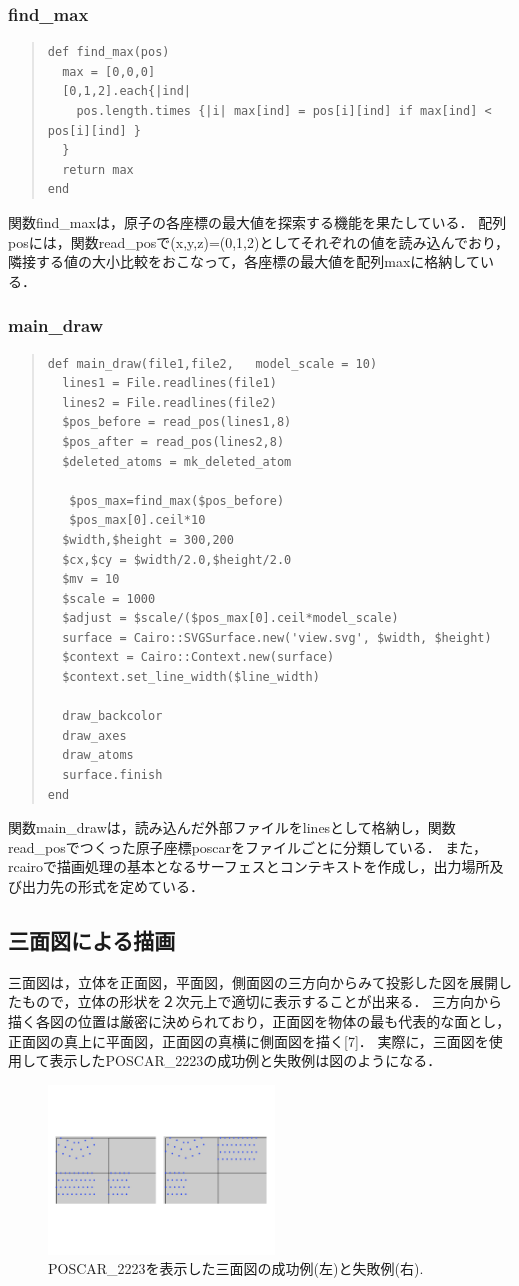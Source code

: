 \subsubsection{find\_max}\begin{quote}\begin{verbatim}
def find_max(pos)
  max = [0,0,0]
  [0,1,2].each{|ind|
    pos.length.times {|i| max[ind] = pos[i][ind] if max[ind] < pos[i][ind] }
  }
  return max
end
\end{verbatim}\end{quote}
関数find\_maxは，原子の各座標の最大値を探索する機能を果たしている．
配列posには，関数read\_posで(x,y,z)=(0,1,2)としてそれぞれの値を読み込んでおり，隣接する値の大小比較をおこなって，各座標の最大値を配列maxに格納している．

\subsubsection{main\_draw}\begin{quote}\begin{verbatim}
def main_draw(file1,file2,   model_scale = 10)
  lines1 = File.readlines(file1)
  lines2 = File.readlines(file2)
  $pos_before = read_pos(lines1,8)
  $pos_after = read_pos(lines2,8)
  $deleted_atoms = mk_deleted_atom

   $pos_max=find_max($pos_before)
   $pos_max[0].ceil*10
  $width,$height = 300,200
  $cx,$cy = $width/2.0,$height/2.0
  $mv = 10
  $scale = 1000
  $adjust = $scale/($pos_max[0].ceil*model_scale)
  surface = Cairo::SVGSurface.new('view.svg', $width, $height)
  $context = Cairo::Context.new(surface)
  $context.set_line_width($line_width)

  draw_backcolor
  draw_axes
  draw_atoms
  surface.finish
end
\end{verbatim}\end{quote}
関数main\_drawは，読み込んだ外部ファイルをlinesとして格納し，関数read\_posでつくった原子座標poscarをファイルごとに分類している．
また，rcairoで描画処理の基本となるサーフェスとコンテキストを作成し，出力場所及び出力先の形式を定めている．

\subsection{三面図による描画}
三面図は，立体を正面図，平面図，側面図の三方向からみて投影した図を展開したもので，立体の形状を２次元上で適切に表示することが出来る．
三方向から描く各図の位置は厳密に決められており，正面図を物体の最も代表的な面とし，正面図の真上に平面図，正面図の真横に側面図を描く[7]．
実際に，三面図を使用して表示したPOSCAR\_2223の成功例と失敗例は図のようになる．

\begin{figure}[htbp]\begin{center}
\includegraphics[width=6cm,bb=0 0 442 500]{../figs/./boundary_narita.014.jpg}
\caption{POSCAR\_2223を表示した三面図の成功例(左)と失敗例(右).}
\label{default}\end{center}\end{figure}
